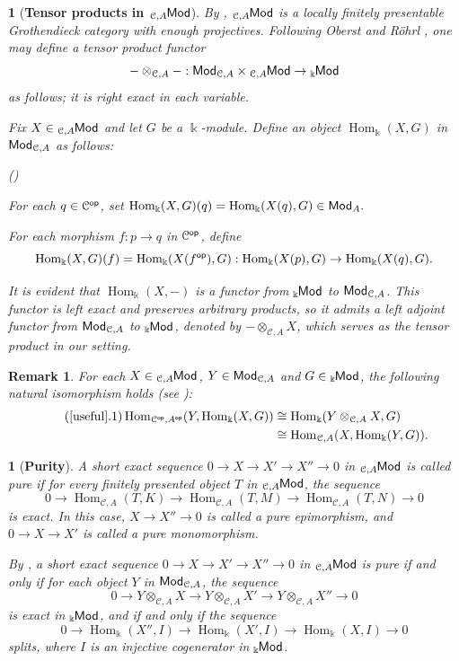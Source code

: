 \documentclass{amsart}
\theoremstyle{bfupright head,slanted body}
\theoremstyle{bfupright head,upright body}
\newtheorem{bfhpg}[res]{}               \newtheorem*{bfhpg*}{}
\theoremstyle{fixed bf head,slanted body}
\theoremstyle{fixed bf head,upright body}
\newtheorem{rmk}[res]{Remark}           \newtheorem*{rmk*}{Remark}
\theoremstyle{numbered paragraph}
\newlength{\thmlistleft}        %
\newlength{\thmlistright}       %
\newlength{\thmlistpartopsep}   %
\newlength{\thmlisttopsep}      %
\newlength{\thmlistparsep}      %
\newlength{\thmlistitemsep}     %
\newcounter{prt}
\newenvironment{prt}{\begin{list}{\upshape (\alph{prt})}%
		{\usecounter{prt}%
			\setlength{\leftmargin}{\thmlistleft}%
			\setlength{\labelwidth}{\thmlistleft}%
			\setlength{\rightmargin}{\thmlistright}%
			\setlength{\partopsep}{\thmlistpartopsep}%
			\setlength{\topsep}{\thmlisttopsep}%
			\setlength{\parsep}{\thmlistparsep}%
			\setlength{\itemsep}{\thmlistitemsep}}}%
	{\end{list}}%
\numberwithin{equation}{res}
\newcommand{\Hom}[3][]{\operatorname{Hom}_{#1}(#2,#3)}
\newcommand{\C}{\mathcal{C}}
\newcommand{\kk}{\Bbbk}
\newcommand{\lMod}[1]{{}_{#1}\mspace{-1mu}{\sf{Mod}}}
\newcommand{\rMod}[1]{{\sf{Mod}}_{#1}}
\begin{document}
\begin{bfhpg}[\bf Tensor products in $\lMod{\C,A}$]\label{tensor}
By \cite[Proposition 3.12]{HJ21}, $\lMod{\C,A}$ is a locally finitely presentable Grothendieck category with enough projectives. Following Oberst and R\"{o}hrl \cite{Oberst70}, one may define a tensor product functor
\[-\otimes_{\C,A}-: \rMod{\C,A}\times \lMod{\C,A}\to \lMod{\kk}\]
as follows; it is right exact in each variable.

Fix $X\in \lMod{\C,A}$ and let $G$ be a $\Bbbk$-module. Define an object $\Hom[\Bbbk]{X}{G}$ in $\rMod{\C,A}$ as follows:
 \begin{prt}
\item[$\bullet$] For each $q\in\C^{\sf op}$, set
                 $\Hom[\Bbbk]{X}{G}(q)=\Hom[\Bbbk]{X(q)}{G}\in \rMod{A}.$
\item[$\bullet$] For each morphism $f: p\to q$ in $\C^{\sf op}$, define
\[\Hom[\Bbbk]{X}{G}(f)=\Hom[\Bbbk]{X(f^{\sf op})}{G}:\Hom[\Bbbk]{X(p)}{G}\to \Hom[\Bbbk]{X(q)}{G}.\]
\end{prt}
It is evident that $\Hom[\Bbbk]{X}{-}$ is a functor from $\lMod{\Bbbk}$ to $\rMod{\C,A}$. This functor is left exact and preserves arbitrary products, so it admits a left adjoint functor from $\rMod{\C,A}$ to $\lMod{\Bbbk}$, denoted by $-\otimes_{\C,A} X$, which serves as the tensor product in our setting.
\end{bfhpg}

\begin{rmk}\label{useful}
For each $X\in\lMod{\C,A}$, $Y\in\rMod{\C,A}$ and $G\in\lMod{\Bbbk}$, the following natural isomorphism holds (see \cite[Theorem 1]{St68}):
\begin{align*}\label{1.9.1}\tag{\ref{useful}.1}
\Hom[\C^{\sf op},A^{\sf op}]{Y}{\Hom[\Bbbk]{X}{G}}
& \cong \Hom[\Bbbk]{Y\otimes_{\C,A} X}{G}                \\
& \cong \Hom[\C,A]{X}{\Hom[\kk]{Y}{G}}.
\end{align*}
\end{rmk}

\begin{bfhpg}[\bf Purity]
A short exact sequence $0 \to X \to X' \to X'' \to 0$ in $\lMod{\C,A}$ is called \emph{pure} if for every finitely presented object $T$ in $\lMod{\C,A}$, the sequence
\[
0\to \Hom[\C,A]{T}{K} \to \Hom[\C,A]{T}{M} \to \Hom[\C,A]{T}{N} \to 0
\]
is exact. In this case, $X\to X''\to 0$ is called a \emph{pure epimorphism}, and $0\to X \to X'$ is called a \emph{pure monomorphism}.

By \cite[Theorem 2]{St68}, a short exact sequence
$0 \to X\to X'\to X''\to 0$
in $\lMod{\C,A}$ is pure if and only if for each object $Y$ in $\rMod{\C,A}$, the sequence
\[
0 \to Y\otimes_{\C,A} X \to Y\otimes_{\C,A} X' \to Y\otimes_{\C,A} X'' \to 0
\]
is exact in $\lMod{\Bbbk}$, and if and only if the sequence
\[
0 \to \Hom[\Bbbk]{X''}{I} \to \Hom[\Bbbk]{X'}{I} \to \Hom[\Bbbk]{X}{I} \to 0
\]
splits, where $I$ is an injective cogenerator in $\lMod{\Bbbk}$.
\end{bfhpg}
\end{document}
